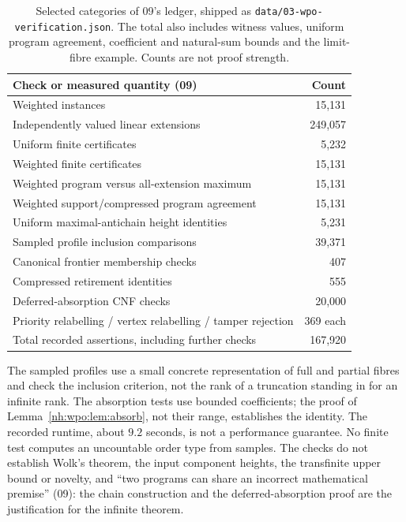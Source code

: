 \documentclass[11pt,a4paper]{article}
\theoremstyle{definition}
\theoremstyle{remark}
\begin{document}
\begin{table}[htbp]
\centering\small
\begin{tabularx}{\linewidth}{@{}Xr@{}}
\toprule
Check or measured quantity (09) & Count\\
\midrule
Weighted instances & 15,131\\
Independently valued linear extensions & 249,057\\
Uniform finite certificates & 5,232\\
Weighted finite certificates & 15,131\\
Weighted program versus all-extension maximum & 15,131\\
Weighted support/compressed program agreement & 15,131\\
Uniform maximal-antichain height identities & 5,231\\
Sampled profile inclusion comparisons & 39,371\\
Canonical frontier membership checks & 407\\
Compressed retirement identities & 555\\
Deferred-absorption CNF checks & 20,000\\
Priority relabelling / vertex relabelling / tamper rejection & 369 each\\
\midrule
Total recorded assertions, including further checks & 167,920\\
\bottomrule
\end{tabularx}
\caption{Selected categories of 09's ledger, shipped as
\texttt{data/03-wpo-verification.json}. The total also includes witness values,
uniform program agreement, coefficient and natural-sum bounds and the limit-fibre
example. Counts are not proof strength.}
\label{nh:wpo:tab:verify}
\end{table}

The sampled profiles use a small concrete representation of full and partial
fibres and check the inclusion criterion, not the rank of a truncation standing
in for an infinite rank. The absorption tests use bounded coefficients; the proof
of Lemma~\ref{nh:wpo:lem:absorb}, not their range, establishes the identity. The
recorded runtime, about $9.2$ seconds, is not a performance guarantee. No finite
test computes an uncountable order type from samples. The checks do not
establish Wolk's theorem, the input component heights, the transfinite upper
bound or novelty, and ``two programs can share an incorrect mathematical
premise'' (09): the chain construction and the deferred-absorption proof are the
justification for the infinite theorem.
\end{document}
